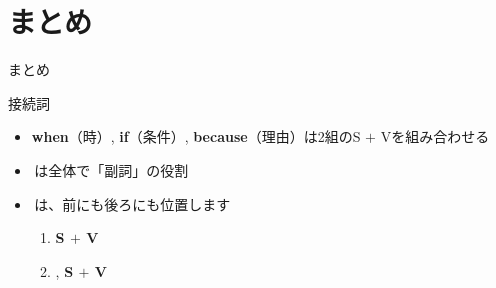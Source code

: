 \documentclass[aspectratio=169,xcolor={dvipsnames,table}]{beamer}
\begin{document}
\section{まとめ}
\begin{frame}[plain]{まとめ}
\begin{block}{接続詞}
 \begin{itemize}[square]\small
  \item \textbf{when}（時）, \textbf{if}（条件）, \textbf{because}（理由）は2組のS $+$ Vを組み合わせる
 \item   {}\,は全体で「副詞」の役割
 \item   {}\,は、前にも後ろにも位置します
	 \begin{enumerate}
	  \item {\bfseries S $+$ V}\,\,
	  \item {},\,\,{\bfseries S $+$ V}
	 \end{enumerate}
 \end{itemize}
\end{block}
\end{frame}
\end{document}
